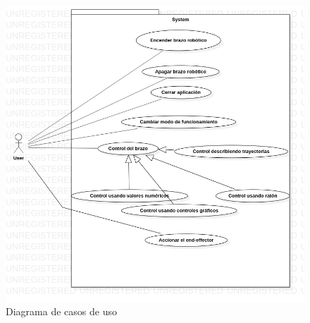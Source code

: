 

\begin{figure}[H]
    \centering
    \includegraphics[width=.7\textwidth]{images/UseCaseDiagram1.png}
    \caption{Diagrama de casos de uso}
    \label{fig:diagrama_casos_uso}
\end{figure}


